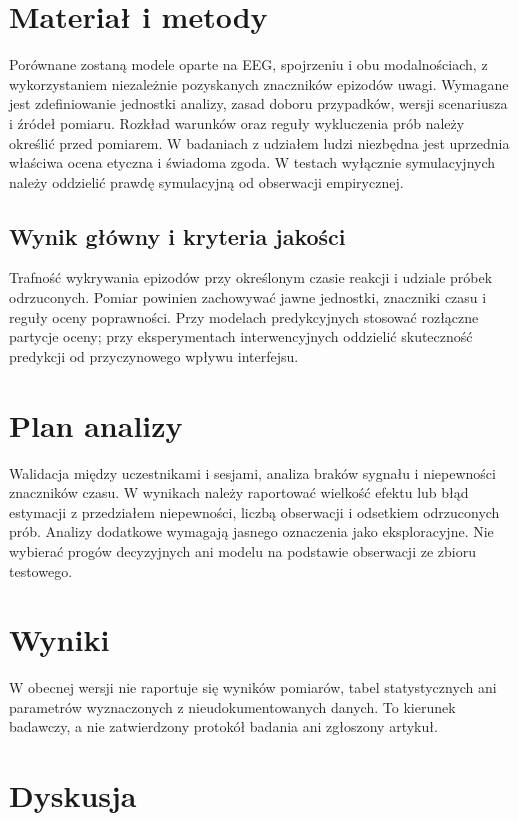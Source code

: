 \documentclass[11pt,a4paper]{article}
\begin{document}
\section{Materiał i metody}

Porównane zostaną modele oparte na EEG, spojrzeniu i obu modalnościach, z wykorzystaniem niezależnie pozyskanych znaczników epizodów uwagi. Wymagane jest zdefiniowanie jednostki analizy, zasad doboru przypadków, wersji scenariusza i źródeł pomiaru. Rozkład warunków oraz reguły wykluczenia prób należy określić przed pomiarem. W badaniach z udziałem ludzi niezbędna jest uprzednia właściwa ocena etyczna i świadoma zgoda. W testach wyłącznie symulacyjnych należy oddzielić prawdę symulacyjną od obserwacji empirycznej.

\subsection{Wynik główny i kryteria jakości}

Trafność wykrywania epizodów przy określonym czasie reakcji i udziale próbek odrzuconych. Pomiar powinien zachowywać jawne jednostki, znaczniki czasu i reguły oceny poprawności. Przy modelach predykcyjnych stosować rozłączne partycje oceny; przy eksperymentach interwencyjnych oddzielić skuteczność predykcji od przyczynowego wpływu interfejsu.

\section{Plan analizy}

Walidacja między uczestnikami i sesjami, analiza braków sygnału i niepewności znaczników czasu. W wynikach należy raportować wielkość efektu lub błąd estymacji z przedziałem niepewności, liczbą obserwacji i odsetkiem odrzuconych prób. Analizy dodatkowe wymagają jasnego oznaczenia jako eksploracyjne. Nie wybierać progów decyzyjnych ani modelu na podstawie obserwacji ze zbioru testowego.

\section{Wyniki}

W obecnej wersji nie raportuje się wyników pomiarów, tabel statystycznych ani parametrów wyznaczonych z nieudokumentowanych danych. To kierunek badawczy, a nie zatwierdzony protokół badania ani zgłoszony artykuł.

\section{Dyskusja}
\end{document}
